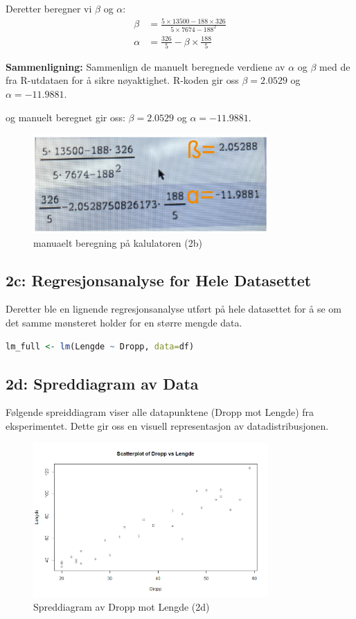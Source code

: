 \documentclass{article}
\begin{document}
Deretter beregner vi \( \beta \) og \( \alpha \):
\begin{align*}
\beta &= \frac{5 \times 13500 - 188 \times 326}{5 \times 7674 - 188^2} \\
\alpha &= \frac{326}{5} - \beta \times \frac{188}{5}
\end{align*}

\textbf{Sammenligning:} 
Sammenlign de manuelt beregnede verdiene av \( \alpha \) og \( \beta \) med de fra R-utdataen for å sikre nøyaktighet.
R-koden gir oss \( \beta = 2.0529 \) og \( \alpha = -11.9881 \).

og manuelt beregnet gir oss: \( \beta = 2.0529 \) og \( \alpha = -11.9881 \).
\begin{figure}[H]
    \centering
    \includegraphics[width=0.8\textwidth]{manual_calculation_regresion.png}
    \caption{manuaelt beregning på kalulatoren (2b)}
\end{figure}

\subsection{2c: Regresjonsanalyse for Hele Datasettet}
Deretter ble en lignende regresjonsanalyse utført på hele datasettet for å se om det samme mønsteret holder for en større mengde data.

\begin{lstlisting}[language=R]
lm_full <- lm(Lengde ~ Dropp, data=df)
\end{lstlisting}

\subsection{2d: Spreddiagram av Data}
Følgende spreiddiagram viser alle datapunktene (Dropp mot Lengde) fra eksperimentet. Dette gir oss en visuell representasjon av datadistribusjonen.

\begin{figure}[H]
    \centering
    \includegraphics[width=0.8\textwidth]{Rplot03.png}
    \caption{Spreddiagram av Dropp mot Lengde (2d)}
\end{figure}
\end{document}
